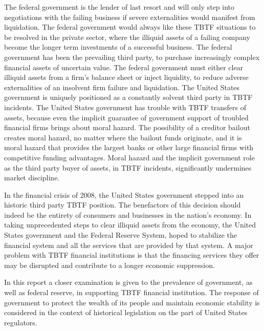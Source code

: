 The federal government is the lender of last resort and will only step into negotiations with the failing business if severe externalities would manifest from liquidation.  The federal government would always like these TBTF situations to be resolved in the private sector, where the illiquid assets of a failing company become the longer term investments of a successful business.\cite{Brewer}\cite{Dowd}  The federal government has been the prevailing third party, to purchase increasingly complex financial assets of uncertain value.  The federal government must either clear illiquid assets from a firm's balance sheet or inject liquidity, to reduce adverse externalities of an insolvent firm failure and liquidation.  The United States government is uniquely positioned as a constantly solvent third party in TBTF incidents.  The United States government has trouble with TBTF transfers of assets, because even the implicit guarantee of government support of troubled financial firms brings about moral hazard.\cite{Dowd}\cite{Zhuo}  The possibility of a creditor bailout creates moral hazard, no matter where the bailout funds originate, and it is moral hazard that provides the largest banks or other large financial firms with competitive funding advantages.\cite{Wallison}\cite{Strongin}  Moral hazard and the implicit government role as the third party buyer of assets, in TBTF incidents, significantly undermines market discipline.\cite{Rime} 

In the financial crisis of 2008, the United States government stepped into an historic third party TBTF position.\cite{Baker}   The benefactors of this decision should indeed be the entirety of consumers and businesses in the nation's economy.  In taking unprecedented steps to clear illiquid assets from the economy, the United States government and the Federal Reserve System, hoped to stabilize the financial system and all the services that are provided by that system.\cite{Dudley}  A major problem with TBTF financial institutions is that the financing services they offer may be disrupted and contribute to a longer economic suppression.  

In this report a closer examination is given to the prevalence of government, as well as federal reserve, in supporting TBTF financial institution.  The response of government to protect the wealth of its people and maintain economic stability is considered in the context of historical legislation on the part of United States regulators.









